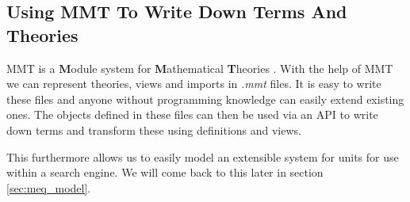 

\subsection{Using MMT To Write Down Terms And Theories}

MMT is a \textbf{M}odule system for \textbf{M}athematical \textbf{T}heories \cite{RabKoh:WSMSML13}. With the help of MMT we can represent theories, views and imports in \textit{.mmt} files. It is easy to write these files and anyone without programming knowledge can easily extend existing ones. The objects defined in these files can then be used via an API to write down terms and transform these using definitions and views.

This furthermore allows us to easily model an extensible system for units for use within a search engine. We will come back to this later in section \ref{sec:meq_model}.
